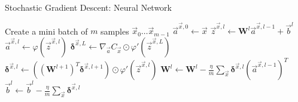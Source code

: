 \begin{algorithm}
\caption{Stochastic Gradient Descent: Neural Network}
\label{alg:backpropnn}
\begin{algorithmic}
    \State Create a mini batch of $m$ samples $\vec{x}_0 \ldots \vec{x}_{m-1}$
        \State $\vec{a}^{\vec{x},0} \gets \vec{x}$  
          
            \State $\vec{z}^{\vec{x},l} \gets \mathbf{W}^l \vec{a}^{\vec{x},l-1}+\vec{b}^l$
            \State $\vec{a}^{\vec{x},l} \gets \varphi(\vec{z}^{\vec{x},l})$
        \EndFor
        \State $\bm{\delta}^{\vec{x},L} \gets \nabla_{\vec{a}} C_\vec{x} \odot \varphi'(\vec{z}^{\vec{x},L})$ 
          
            \State $\bm{\delta}^{\vec{x},l} \gets ((\mathbf{W}^{l+1})^T \bm{\delta}^{\vec{x},l+1})\odot \varphi'(\vec{z}^{\vec{x},l})$
        \EndFor
    \EndFor
     \Comment  {}
        \State $ \mathbf{W}^l \gets \mathbf{W}^l-\frac{\eta}{m} \sum_\vec{x} \bm{\delta}^{\vec{x},l} (\vec{a}^{\vec{x},l-1})^T$
        \State $\vec{b}^l \gets \vec{b}^l-\frac{\eta}{m}\sum_\vec{x} \bm{\delta}^{\vec{x},l}$  
    \EndFor
\end{algorithmic}
\end{algorithm}
